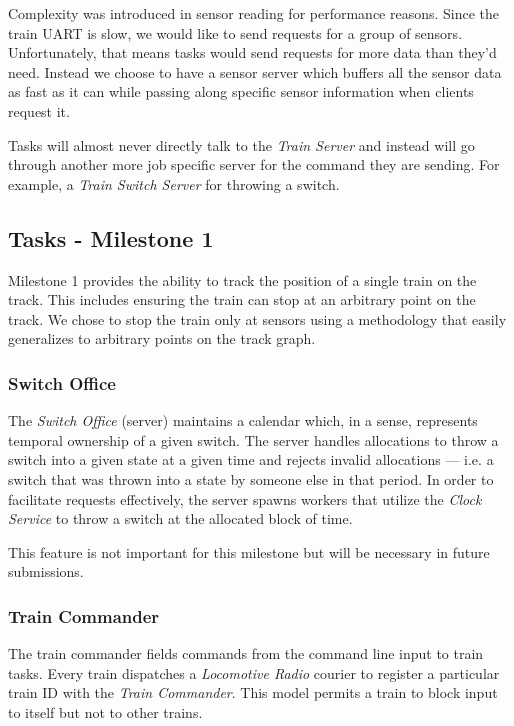 \documentclass[twoside,a4paper]{refart}
\begin{document}
Complexity was introduced in sensor reading for performance reasons. Since the train UART is slow, we would like to send requests for a group of sensors. Unfortunately, that means tasks would send requests for more data than they’d need. Instead we choose to have a sensor server which buffers all the sensor data as fast as it can while passing along specific sensor information when clients request it.

Tasks will almost never directly talk to the \textit{Train Server} and instead will go through another more job specific server for the command they are sending. For example, a \textit{Train Switch Server} for throwing a switch.

\subsection{Tasks - Milestone 1}
Milestone 1 provides the ability to track the position of a single train on the track. This includes ensuring the train can stop at an arbitrary point on the track. We chose to stop the train only at sensors using a methodology that easily generalizes to arbitrary points on the track graph.

\subsubsection{Switch Office}
The \textit{Switch Office} (server) maintains a calendar which, in a sense, represents temporal ownership of a given switch. The server handles allocations to throw a switch into a given state at a given time and rejects invalid allocations --- i.e. a switch that was thrown into a state by someone else in that period. In order to facilitate requests effectively, the server spawns workers that utilize the \textit{Clock Service} to throw a switch at the allocated block of time.

This feature is not important for this milestone but will be necessary in future submissions.

\subsubsection{Train Commander}
\label{sec:traincommander}
The train commander fields commands from the command line input to train tasks. Every train dispatches a \textit{Locomotive Radio} courier to register a particular train ID with the \textit{Train Commander}. This model permits a train to block input to itself but not to other trains.
\end{document}
